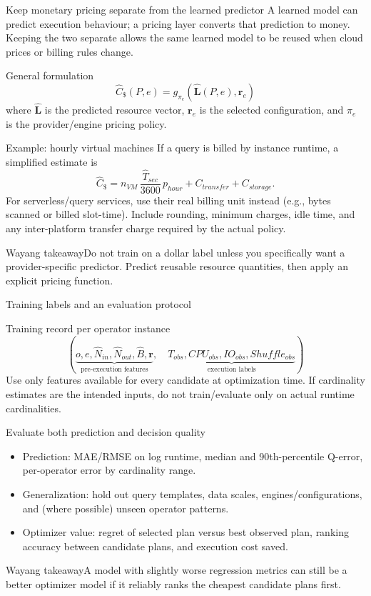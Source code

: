 \documentclass[aspectratio=169,10pt]{beamer}
\newcommand{\takeaway}[1]{\begin{block}{Wayang takeaway}#1\end{block}}
\begin{document}
\begin{frame}[shrink=10]{Keep monetary pricing separate from the learned predictor}
\small
A learned model can predict execution behaviour; a pricing layer converts that prediction to money. Keeping the two separate allows the same learned model to be reused when cloud prices or billing rules change.
\begin{block}{General formulation}
\[
\widehat C_{\$}(P,e)=g_{\pi_e}\!\left(\widehat{\mathbf L}(P,e),\mathbf r_e\right)
\]
where $\widehat{\mathbf L}$ is the predicted resource vector, $\mathbf r_e$ is the selected configuration, and $\pi_e$ is the provider/engine pricing policy.
\end{block}
\begin{block}{Example: hourly virtual machines}
If a query is billed by instance runtime, a simplified estimate is
\[
\widehat C_{\$}=n_{VM}\,\frac{\widehat T_{sec}}{3600}\,p_{hour}+C_{transfer}+C_{storage}.
\]
For serverless/query services, use their real billing unit instead (e.g., bytes scanned or billed slot-time). Include rounding, minimum charges, idle time, and any inter-platform transfer charge required by the actual policy.
\end{block}
\takeaway{Do not train on a dollar label unless you specifically want a provider-specific predictor. Predict reusable resource quantities, then apply an explicit pricing function.}
\end{frame}

\begin{frame}[shrink=10]{Training labels and an evaluation protocol}
\small
\begin{block}{Training record per operator instance}
\[
(\underbrace{o,e,\widehat N_{in},\widehat N_{out},\widehat B,\mathbf r}_{\text{pre-execution features}},\quad
\underbrace{T_{obs},CPU_{obs},IO_{obs},Shuffle_{obs}}_{\text{execution labels}})
\]
Use only features available for every candidate at optimization time. If cardinality estimates are the intended inputs, do not train/evaluate only on actual runtime cardinalities.
\end{block}
\begin{block}{Evaluate both prediction and decision quality}
\begin{itemize}\setlength\itemsep{2pt}
  \item Prediction: MAE/RMSE on log runtime, median and 90th-percentile Q-error, per-operator error by cardinality range.
  \item Generalization: hold out query templates, data scales, engines/configurations, and (where possible) unseen operator patterns.
  \item Optimizer value: regret of selected plan versus best observed plan, ranking accuracy between candidate plans, and execution cost saved.
\end{itemize}
\end{block}
\takeaway{A model with slightly worse regression metrics can still be a better optimizer model if it reliably ranks the cheapest candidate plans first.}
\end{frame}
\end{document}
